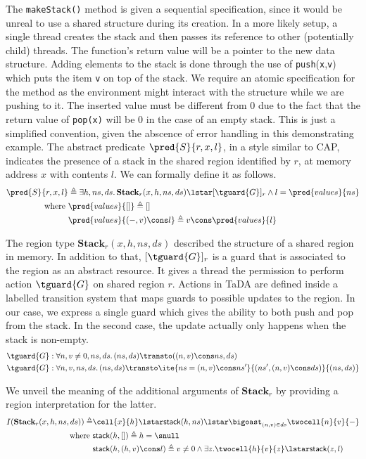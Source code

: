 The \texttt{makeStack()} method is given a sequential specification, since it would be unreal to use a shared structure during its creation. In a more likely setup, a single thread creates the stack and then passes its reference to other (potentially child) threads. The function's return value will be a pointer to the new data structure. Adding elements to the stack is done through the use of \texttt{push}(\texttt{x},\texttt{v}) which puts the item \texttt{v} on top of the stack. We require an atomic specification for the method as the environment might interact with the structure while we are pushing to it. The inserted value must be different from $0$ due to the fact that the return value of \texttt{pop(x)} will be $0$ in the case of an empty stack. This is just a simplified convention, given the abscence of error handling in this demonstrating example. The abstract predicate $\pred{S}{r, x, l}$, in a style similar to CAP, indicates the presence of a stack in the shared region identified by $r$, at memory address $x$ with contents $l$. We can formally define it as follows.
\begin{align*}
\pred{S}{r, x, l} &\triangleq \exists h, ns, ds \ldotp \textbf{Stack}_r(x, h, ns, ds) \lstar [\tguard{G}]_r \land l = \pred{values}{ns}
\\
\text{where } &\pred{values}{[]} \triangleq []
\\
&\pred{values}{(-, v) \cons l} \triangleq v \cons \pred{values}{l}
\end{align*}

The region type $\textbf{Stack}_r(x, h, ns, ds)$ described the structure of a shared region in memory. In addition to that, $[\tguard{G}]_r$ is a guard that is associated to the region as an abstract resource. It gives a thread the permission to perform action $\tguard{G}$ on shared region $r$. Actions in TaDA are defined inside a labelled transition system that maps guards to possible updates to the region. In our case, we express a single guard which gives the ability to both push and pop from the stack. In the second case, the update actually only happens when the stack is non-empty.
\begin{align*}
&\tguard{G}: \forall n, v \neq 0, ns, ds \ldotp (ns, ds) \transto ((n, v) \cons ns, ds)
\\
&\tguard{G}: \forall n, v, ns, ds \ldotp (ns, ds) \transto \ite{ns = (n, v) \cons ns'}{(ns', (n, v) \cons ds)}{(ns, ds)}
\end{align*}

We unveil the meaning of the additional arguments of $\textbf{Stack}_r$ by providing a region interpretation for the latter.
\begin{align*}
I(\textbf{Stack}_r(x, h, ns, ds)) \triangleq &\cell{x}{h} \lstar \mathsf{stack}(h, ns) \lstar \bigoast_{(n, v) \in ds} \twocell{n}{v}{-}
\\
\text{where } &\mathsf{stack}(h, []) \triangleq h = \snull
\\
&\mathsf{stack}(h, (h, v) \cons l) \triangleq v \neq 0 \land \exists z . \twocell{h}{v}{z} \lstar \mathsf{stack}(z, l)
\end{align*}

